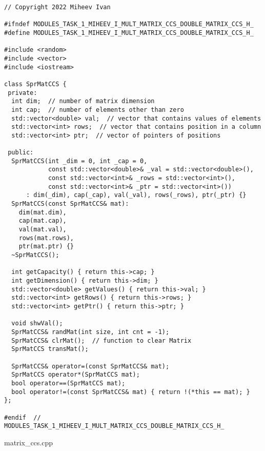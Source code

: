 \documentclass{report}
\begin{document}
\begin{lstlisting}
// Copyright 2022 Miheev Ivan

#ifndef MODULES_TASK_1_MIHEEV_I_MULT_MATRIX_CCS_DOUBLE_MATRIX_CCS_H_
#define MODULES_TASK_1_MIHEEV_I_MULT_MATRIX_CCS_DOUBLE_MATRIX_CCS_H_

#include <random>
#include <vector>
#include <iostream>

class SprMatCCS {
 private:
  int dim;  // number of matrix dimension
  int cap;  // number of elements other than zero
  std::vector<double> val;  // vector that contains values of elements
  std::vector<int> rows;  // vector that contains position in a column
  std::vector<int> ptr;  // vector of pointers of positions

 public:
  SprMatCCS(int _dim = 0, int _cap = 0,
            const std::vector<double>& _val = std::vector<double>(),
            const std::vector<int>& _rows = std::vector<int>(),
            const std::vector<int>& _ptr = std::vector<int>())
      : dim(_dim), cap(_cap), val(_val), rows(_rows), ptr(_ptr) {}
  SprMatCCS(const SprMatCCS& mat):
    dim(mat.dim),
    cap(mat.cap),
    val(mat.val),
    rows(mat.rows),
    ptr(mat.ptr) {}
  ~SprMatCCS();

  int getCapacity() { return this->cap; }
  int getDimension() { return this->dim; }
  std::vector<double> getValues() { return this->val; }
  std::vector<int> getRows() { return this->rows; }
  std::vector<int> getPtr() { return this->ptr; }

  void shwVal(); 
  SprMatCCS& randMat(int size, int cnt = -1);
  SprMatCCS& clrMat();  // function to clear Matrix
  SprMatCCS transMat();

  SprMatCCS& operator=(const SprMatCCS& mat);
  SprMatCCS operator*(SprMatCCS mat);
  bool operator==(SprMatCCS mat);
  bool operator!=(const SprMatCCS& mat) { return !(*this == mat); }
};

#endif  // MODULES_TASK_1_MIHEEV_I_MULT_MATRIX_CCS_DOUBLE_MATRIX_CCS_H_
\end{lstlisting}

\newline matrix\_ccs.cpp
\end{document}
